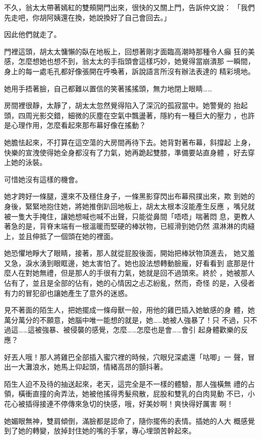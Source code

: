 不久，翁太太帶著嫣紅的雙頰開門出來，很快的又關上門，告訴仲文說：
「我們先走吧，你胡阿姨還在換，她說換好了自己會回去。」

因此他們就走了。

門裡這頭，胡太太慵懶的臥在地板上，回想著剛才面臨高潮時那種令人癲
狂的美感，怎麼想她也想不到，翁太太的手指頭會這樣巧妙，她覺得當崩潰那
一瞬間，身上的每一處毛孔都好像張開在呼喚著，訴說語言所沒有辦法表達的
精彩境地。

她用手捂著臉，自己都難以置信的笑著搖搖頭，無力地閉上眼睛……

房間裡很靜，太靜了，胡太太忽然覺得陷入了深沉的孤寂當中。她警覺的
抬起頭，四周光影交錯，細微的灰塵在空氣中飄盪著，隱約有一種巨大的壓力
，也許是心理作用，怎麼看起來那布幕好像在搖動？

她膽怯起來，不打算在這空蕩的大房間再待下去。她背對著布幕，斜撐起
上身，快樂的宣洩使得她全身都沒有了力氣，她再跪起雙膝，準備要站直身體
，好去穿上她的泳裝。

可惜她沒有這樣的機會。

她才跨好一條腿，還來不及穩住身子，一條黑影穿閃出布幕飛撲出來，欺
到她的身後，緊緊地抱住她，將她推倒趴回地板上，胡太太根本沒能產生反應
，嘴兒就被一隻大手掩住，讓她想喊也喊不出聲，只能從鼻間「唔唔」喘著悶
息，更教人著急的是，背脊末端有一根溫暖而堅硬的棒狀物，已經滑到她仍然
濕淋淋的肉縫上，並且伸抵了一個頭在她的裡面。

她恐懼地睜大了眼睛，接著，那人就從屁股後面，開始把棒狀物頂進去，
她又羞又急，淚水湧到眼眶邊，她太害怕了。她也設法想轉動臉龐，好看看到
底那是什麼人在對她無禮，但是那人的手很有力氣，她就是回不過頭來。終於
，她被那人佔有了，並且是全部的佔有，她的心情因之忐忑紛亂，然而，奇怪
的是，入侵者有力的冒犯卻也讓她產生了意外的迷惑。

見不著面的陌生人，把她擺成一條母獸一般，用他的雞巴插入她敏感的身
體，她萬分萬分的不願意，她腦中唯一能想的就是，她……她被人強暴了！只
不過，只不過這……這被強暴、被侵襲的感覺，怎麼……怎麼也是會……會引
起身體歡樂的反應？

好丟人哦！那人將雞巴全部插入蜜穴裡的時候，穴眼兒深處還「咕唧」一
聲，冒出一大灘浪水，她馬上仰起頭，情緒高昂的顫抖著。

陌生人迫不及待的抽送起來，老天，這完全是不一樣的體驗，那人強橫無
禮的占領，橫衝直撞的肏弄法，她被他搖得秀髮飛散，屁股和雙乳的白肉晃動
不已，小花心被插得接連不停傳來急切的快感，哦，好美妙啊！爽快得好厲害
啊！

她媚眼無神，雙肩傾倒，滿臉都是認命了，隨你擺佈的表情。插她的人大
概感覺到了她的轉變，放掉封住她的嘴的手掌，專心埋頭苦幹起來。

